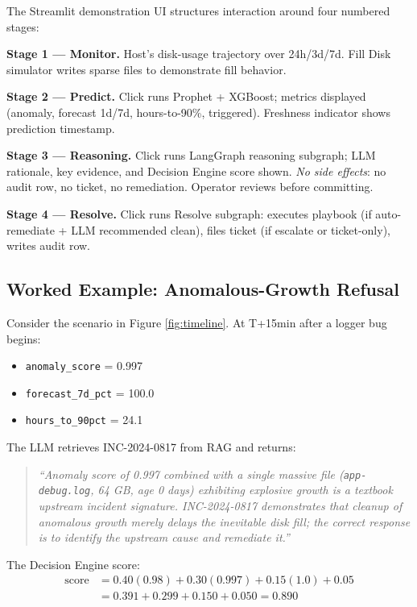 \documentclass[conference]{IEEEtran}
\begin{document}
The Streamlit demonstration UI structures interaction around four
numbered stages:

\textbf{Stage 1 --- Monitor.} Host's disk-usage trajectory over
24h/3d/7d. Fill Disk simulator writes sparse files to demonstrate
fill behavior.

\textbf{Stage 2 --- Predict.} Click runs Prophet + XGBoost; metrics
displayed (anomaly, forecast 1d/7d, hours-to-90\%, triggered).
Freshness indicator shows prediction timestamp.

\textbf{Stage 3 --- Reasoning.} Click runs LangGraph reasoning
subgraph; LLM rationale, key evidence, and Decision Engine score
shown. \emph{No side effects}: no audit row, no ticket, no
remediation. Operator reviews before committing.

\textbf{Stage 4 --- Resolve.} Click runs Resolve subgraph: executes
playbook (if auto-remediate + LLM recommended clean), files ticket
(if escalate or ticket-only), writes audit row.

\subsection{Worked Example: Anomalous-Growth Refusal}

Consider the scenario in Figure \ref{fig:timeline}. At T+15min after
a logger bug begins:
\begin{itemize}
\item \texttt{anomaly\_score} = 0.997
\item \texttt{forecast\_7d\_pct} = 100.0
\item \texttt{hours\_to\_90pct} = 24.1
\end{itemize}

The LLM retrieves INC-2024-0817 from RAG and returns:
\begin{quote}\itshape
``Anomaly score of 0.997 combined with a single massive file
(\texttt{app-debug.log}, 64 GB, age 0 days) exhibiting explosive
growth is a textbook upstream incident signature. INC-2024-0817
demonstrates that cleanup of anomalous growth merely delays the
inevitable disk fill; the correct response is to identify the
upstream cause and remediate it.''
\end{quote}

The Decision Engine score:
\begin{align*}
\text{score} &= 0.40(0.98) + 0.30(0.997) + 0.15(1.0) + 0.05 \\
&= 0.391 + 0.299 + 0.150 + 0.050 = 0.890
\end{align*}
\end{document}
